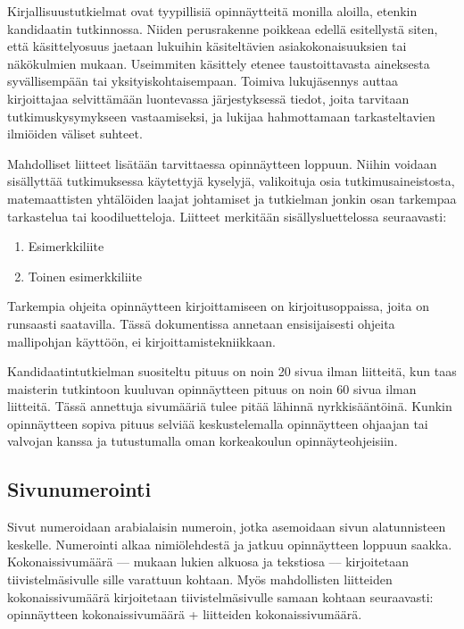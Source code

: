\documentclass[finnish, 12pt, a4paper, arts, utf8, a-2b, online]{aaltothesis}
\begin{document}
Kirjallisuustutkielmat ovat tyypillisiä opinnäytteitä monilla aloilla, etenkin 
kandidaatin tutkinnossa. Niiden perusrakenne poikkeaa edellä esitellystä siten, 
että käsittelyosuus jaetaan lukuihin käsiteltävien asiakokonaisuuksien tai 
näkökulmien mukaan. Useimmiten käsittely etenee taustoittavasta aineksesta 
syvällisempään tai yksityiskohtaisempaan. Toimiva lukujäsennys auttaa 
kirjoittajaa selvittämään luontevassa järjestyksessä tiedot, joita tarvitaan 
tutkimuskysymykseen vastaamiseksi, ja lukijaa hahmottamaan tarkasteltavien 
ilmiöiden väliset suhteet.

Mahdolliset liitteet lisätään tarvittaessa opinnäytteen loppuun. Niihin voidaan 
sisällyttää tutkimuksessa käytettyjä kyselyjä, valikoituja osia 
tutkimusaineistosta, matemaattisten yhtälöiden laajat johtamiset ja tutkielman 
jonkin osan tarkempaa tarkastelua tai koodiluetteloja. Liitteet merkitään 
sisällysluettelossa seuraavasti:
\begin{enumerate}
	\renewcommand{\labelenumi}{\Alph{enumi}.}
	\item Esimerkkiliite
	\item Toinen esimerkkiliite
\end{enumerate}

Tarkempia ohjeita opinnäytteen kirjoittamiseen on kirjoitusoppaissa, joita on 
runsaasti saatavilla. Tässä dokumentissa annetaan ensisijaisesti ohjeita 
mallipohjan käyttöön, ei kirjoittamistekniikkaan. 

Kandidaatintutkielman suositeltu pituus on noin 20 sivua ilman liitteitä, kun 
taas maisterin tutkintoon kuuluvan opinnäytteen pituus on noin 60 sivua ilman 
liitteitä. Tässä annettuja sivumääriä tulee pitää lähinnä nyrkkisääntöinä. 
Kunkin opinnäytteen sopiva pituus selviää keskustelemalla opinnäytteen ohjaajan 
tai valvojan kanssa ja tutustumalla oman korkeakoulun opinnäyteohjeisiin.


\subsection{Sivunumerointi}

Sivut numeroidaan arabialaisin numeroin, jotka asemoidaan sivun alatunnisteen 
keskelle. Numerointi alkaa nimiölehdestä ja jatkuu opinnäytteen loppuun saakka. 
Kokonaissivumäärä --- mukaan lukien alkuosa ja tekstiosa --– kirjoitetaan 
tiivistelmäsivulle sille varattuun kohtaan. Myös mahdollisten liitteiden 
kokonaissivumäärä kirjoitetaan tiivistelmäsivulle samaan kohtaan seuraavasti: 
opinnäytteen kokonaissivumäärä + liitteiden kokonaissivumäärä.
\end{document}
